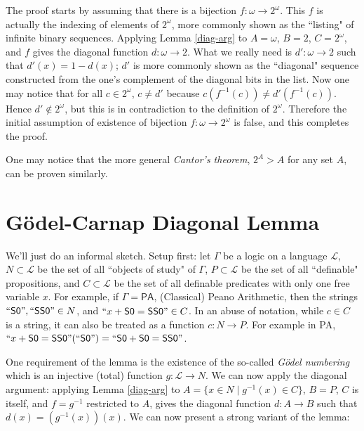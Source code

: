 \documentclass{article}
\begin{document}
The proof starts by assuming that there is a bijection $f:\omega \rightarrow 2^{\omega}$. This $f$ is actually the indexing of elements of $2^{\omega}$, more commonly shown as the ``listing" of infinite binary sequences. Applying Lemma \ref{diag-arg} to $A = \omega$, $B = 2$, $C = 2^{\omega}$, and $f$ gives the diagonal function $d:\omega \rightarrow 2$. What we really need is $d':\omega \rightarrow 2$ such that $d'(x) = 1 - d(x)$; $d'$ is more commonly shown as the ``diagonal" sequence constructed from the one's complement of the diagonal bits in the list. Now one may notice that for all $c \in 2^{\omega}$, $c \ne d'$ because $c(f^{-1}(c)) \ne d'(f^{-1}(c))$. Hence $d' \not\in 2^{\omega}$, but this is in contradiction to the definition of $2^{\omega}$. Therefore the initial assumption of existence of bijection $f:\omega \rightarrow 2^{\omega}$ is false, and this completes the proof.

One may notice that the more general \textit{Cantor's theorem}, $2^{A} > A$ for any set $A$, can be proven similarly.

\section{Gödel-Carnap Diagonal Lemma}
We'll just do an informal sketch. Setup first: let $\Gamma$ be a logic on a language $\mathcal{L}$, $N \subset \mathcal{L}$ be the set of all ``objects of study" of $\Gamma$, $P \subset \mathcal{L}$ be the set of all ``definable" propositions, and $C \subset \mathcal{L}$ be the set of all definable predicates with only one free variable $x$. For example, if $\Gamma = \textsf{PA}$, (Classical) Peano Arithmetic, then the strings $``\textsf{S0}", ``\textsf{SS0}" \in N$, and $``x + \textsf{S0} = \textsf{SS0}" \in C$. In an abuse of notation, while $c \in C$ is a string, it can also be treated as a function $c:N \rightarrow P$. For example in \textsf{PA}, $``x + \textsf{S0} = \textsf{SS0}"(``\textsf{S0}") = ``\textsf{S0} + \textsf{S0} = \textsf{SS0}"$.

One requirement of the lemma is the existence of the so-called \textit{Gödel numbering} which is an injective (total) function $g:\mathcal{L} \rightarrow N$. We can now apply the diagonal argument: applying Lemma \ref{diag-arg} to $A = \{x \in N \mid g^{-1}(x) \in C\}$, $B = P$, $C$ is itself, and $f = g^{-1}$ restricted to $A$, gives the diagonal function $d: A \rightarrow B$ such that $d(x) = (g^{-1}(x))(x)$. We can now present a strong variant of the lemma:
\end{document}
